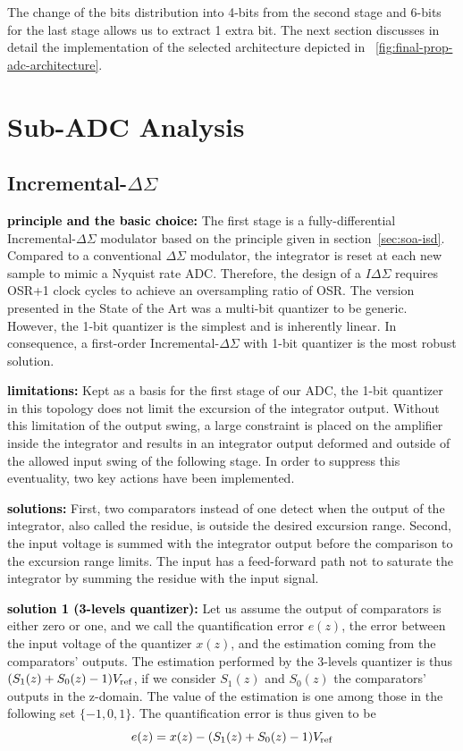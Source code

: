 The change of the bits distribution into 4-bits from the second stage and 6-bits for the last stage allows us to extract 1 extra bit. The next section discusses in detail the implementation of the selected architecture depicted in \figurename~\ref{fig:final-prop-adc-architecture}.

\section{Sub-ADC Analysis}
\subsection{Incremental-\(\Delta\Sigma \)} %

\textbf{\textcolor{black}{principle and the basic choice:}}
The first stage is a fully-differential Incremental-\(\Delta\Sigma \) modulator based on the principle given in section~\ref{sec:soa-isd}.
Compared to a conventional $\Delta\Sigma$ modulator, the integrator is reset at each new sample to mimic a Nyquist rate ADC\@. Therefore, the design of a \(I\Delta\Sigma \) requires OSR+1 clock cycles to achieve an oversampling ratio of OSR\@. The version presented in the State of the Art was a multi-bit quantizer to be generic. However, the 1-bit quantizer is the simplest and is inherently linear. In consequence, a first-order Incremental-$\Delta\Sigma$ with 1-bit quantizer is the most robust solution.

\textbf{\textcolor{black}{limitations:}}
Kept as a basis for the first stage of our ADC, the 1-bit quantizer in this topology does not limit the excursion of the integrator output. Without this limitation of the output swing, a large constraint is placed on the amplifier inside the integrator and results in an integrator output deformed and outside of the allowed input swing of the following stage. In order to suppress this eventuality, two key actions have been implemented.

\textbf{\textcolor{black}{solutions:}}
First, two comparators instead of one detect when the output of the integrator, also called the residue, is outside the desired excursion range. Second, the input voltage is summed with the integrator output before the comparison to the excursion range limits. The input has a feed-forward path not to saturate the integrator by summing the residue with the input signal.

\textbf{\textcolor{black}{solution 1 (3-levels quantizer):}}
Let us assume the output of comparators is either zero or one, and we call the quantification error $e(z)$, the error between the input voltage of the quantizer $x(z)$, and the estimation coming from the comparators' outputs. The estimation performed by the 3-levels quantizer is thus \((S_1(z)+S_0(z)-1)V_{\rm ref} \), if we consider $S_1(z)$ and $S_0(z)$ the comparators' outputs in the z-domain. The value of the estimation is one among those in the following set \(\{-1,0,1\}\). The quantification error is thus given to be
\begin{equation}
	e(z) = x(z) - (S_1(z)+S_0(z)-1)V_{\rm ref}
\end{equation}

